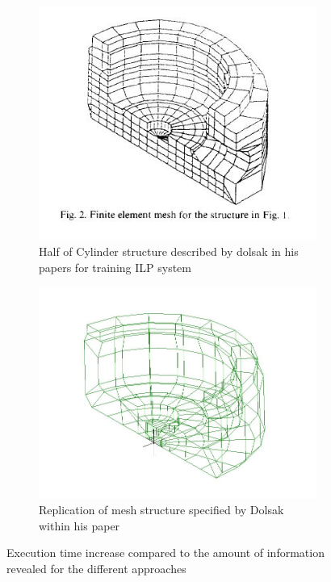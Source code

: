 \begin{figure}[H]
\centering
\begin{subfigure}{.5\textwidth}
  \centering
  \includegraphics[width=0.9\linewidth]{../Graphics/HalfCylinder/DolsakCylinderMeshed.jpeg}
  \caption{Half of Cylinder structure described by dolsak in his papers for training ILP system}
  \label{fig:sub1}
\end{subfigure}%
\begin{subfigure}{.5\textwidth}
  \centering
  \includegraphics[width=0.9\linewidth]{../Graphics/HalfCylinder/DolsakCylinderWithinLisa.jpeg}
  \caption{Replication of mesh structure specified by Dolsak within his paper \cite{Dolsak91}}
  \label{fig:sub2}
\end{subfigure}
\label{fig:test}
  \caption{Execution time increase compared to the amount of information revealed for the different approaches}
 \end{figure}
 
